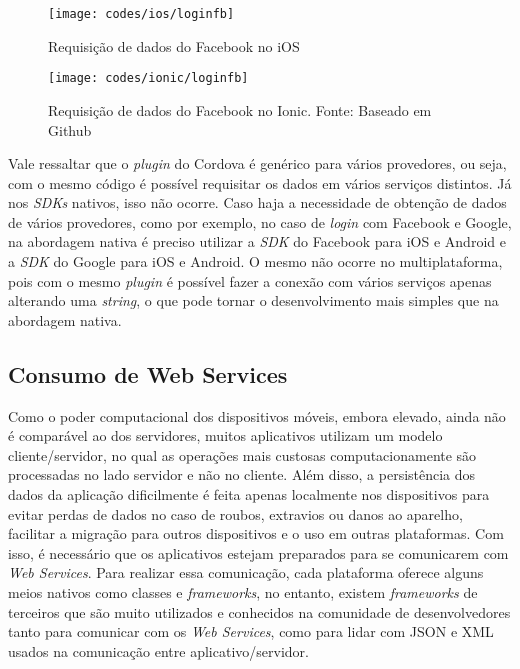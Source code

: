 \begin{figure}[H]
	\centering
	\texttt{[image: codes/ios/loginfb]}
	\caption[Requisição de dados do Facebook no iOS]{Requisição de dados do Facebook no iOS}
	\label{fig:loginfb-ios}
\end{figure}

\begin{figure}[H]
	\centering
	\texttt{[image: codes/ionic/loginfb]}
	\caption[Requisição de dados do Facebook no Ionic]{Requisição de dados do Facebook no Ionic. Fonte: Baseado em Github\protect\footnotemark}
	\label{fig:loginfb-ionic}
\end{figure}


Vale ressaltar que o \textit{plugin} do Cordova é genérico para vários provedores, ou seja, com o mesmo código é possível requisitar os dados em vários serviços distintos. Já nos \textit{SDKs} nativos, isso não ocorre.
Caso haja a necessidade de obtenção de dados de vários provedores, como por exemplo, no caso de \textit{login} com Facebook e Google, na abordagem nativa é preciso utilizar a \textit{SDK} do Facebook para iOS e Android
e a \textit{SDK} do Google para iOS e Android. O mesmo não ocorre no multiplataforma, pois com o mesmo \textit{plugin} é possível fazer a conexão com vários serviços apenas alterando uma \textit{string}, 
o que pode tornar o desenvolvimento mais simples que na abordagem nativa.

\subsection{Consumo de Web Services} \label{subsec:webservices}
Como o poder computacional dos dispositivos móveis, embora elevado, ainda não é comparável ao dos servidores, muitos aplicativos utilizam um modelo cliente/servidor, no qual
as operações mais custosas computacionamente são processadas no lado servidor e não no cliente. Além disso, a persistência dos dados da aplicação dificilmente é feita apenas localmente nos dispositivos para evitar 
perdas de dados no caso de roubos, extravios ou danos ao aparelho, facilitar a migração para outros dispositivos e o uso em outras plataformas. Com isso, é necessário que os aplicativos estejam preparados para se 
comunicarem com \textit{Web Services}. Para realizar essa comunicação, cada plataforma oferece alguns meios nativos como classes e \textit{frameworks}, no entanto, existem \textit{frameworks} de terceiros que 
são muito utilizados e conhecidos na comunidade de desenvolvedores tanto para comunicar com os \textit{Web Services}, como para lidar com JSON e XML usados na comunicação entre aplicativo/servidor. 

